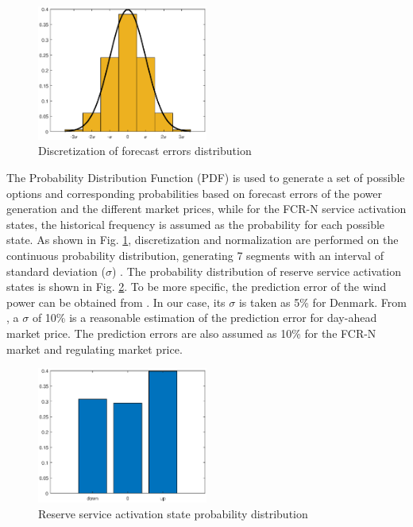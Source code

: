 \documentclass[final,5p,times,twocolumn,authoryear]{elsarticle}
\begin{document}
\begin{figure}[h]
    \centering
    \includegraphics[width=0.5\textwidth,height =0.25\textwidth]{figures/distribution.eps}
    \caption{Discretization of forecast errors distribution}
    \label{fig:distribution}
\end{figure}

The Probability Distribution Function (PDF) is used to generate a set of possible options and corresponding probabilities based on forecast errors of the power generation and the different market prices, while for the FCR-N service activation states, the historical frequency is assumed as the probability for each possible state. As shown in Fig. \ref{fig:distribution}, discretization and normalization are performed on the continuous probability distribution, generating 7 segments with an interval of standard deviation ($\sigma$) \cite{Niknam2012AnOperation}. The probability distribution of reserve service activation states is shown in Fig. \ref{fig:reserve}. To be more specific, the prediction error of the wind power can be obtained from \cite{Hodge2012}. In our case, its $\sigma$ is taken as 5\% for Denmark. From \cite{Karabiber2019, Cerjan2019}, a $\sigma$ of 10\% is a reasonable estimation of the prediction error for day-ahead market price. The prediction errors are also assumed as 10\% for the FCR-N market and regulating market price.

\begin{figure}[h]
    \centering
    \includegraphics[width=0.5\textwidth,height =0.25\textwidth]{figures/reserve.eps}
    \caption{Reserve service activation state probability distribution }
    \label{fig:reserve}
\end{figure}
\end{document}
